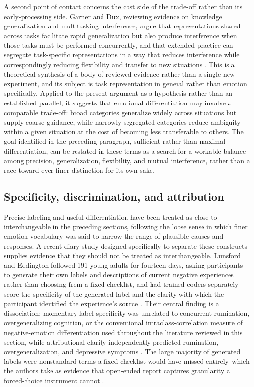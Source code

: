 \documentclass[11pt]{article}
\begin{document}
A second point of contact concerns the cost side of the trade-off rather than its early-processing side. Garner and Dux, reviewing evidence on knowledge generalization and multitasking interference, argue that representations shared across tasks facilitate rapid generalization but also produce interference when those tasks must be performed concurrently, and that extended practice can segregate task-specific representations in a way that reduces interference while correspondingly reducing flexibility and transfer to new situations \citep{GarnerDux2023}. This is a theoretical synthesis of a body of reviewed evidence rather than a single new experiment, and its subject is task representation in general rather than emotion specifically. Applied to the present argument as a hypothesis rather than an established parallel, it suggests that emotional differentiation may involve a comparable trade-off: broad categories generalize widely across situations but supply coarse guidance, while narrowly segregated categories reduce ambiguity within a given situation at the cost of becoming less transferable to others. The goal identified in the preceding paragraph, sufficient rather than maximal differentiation, can be restated in these terms as a search for a workable balance among precision, generalization, flexibility, and mutual interference, rather than a race toward ever finer distinction for its own sake.

\subsection{Specificity, discrimination, and attribution}\label{sub:specificity}

Precise labeling and useful differentiation have been treated as close to interchangeable in the preceding sections, following the loose sense in which finer emotion vocabulary was said to narrow the range of plausible causes and responses. A recent diary study designed specifically to separate these constructs supplies evidence that they should not be treated as interchangeable. Lunsford and Eddington followed 191 young adults for fourteen days, asking participants to generate their own labels and descriptions of current negative experiences rather than choosing from a fixed checklist, and had trained coders separately score the specificity of the generated label and the clarity with which the participant identified the experience's source \citep{LunsfordEddington2026}. Their central finding is a dissociation: momentary label specificity was unrelated to concurrent rumination, overgeneralizing cognition, or the conventional intraclass-correlation measure of negative-emotion differentiation used throughout the literature reviewed in this section, while attributional clarity independently predicted rumination, overgeneralization, and depressive symptoms \citep{LunsfordEddington2026}. The large majority of generated labels were nonstandard terms a fixed checklist would have missed entirely, which the authors take as evidence that open-ended report captures granularity a forced-choice instrument cannot \citep{LunsfordEddington2026}.
\end{document}
